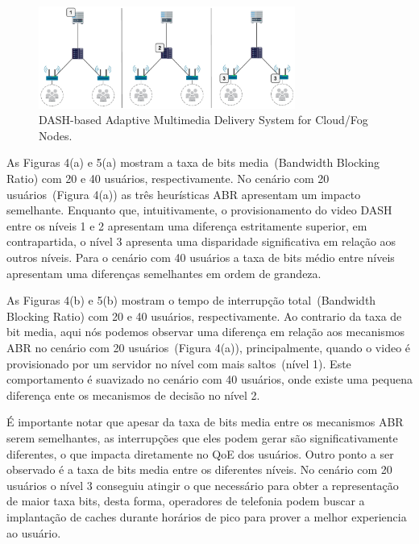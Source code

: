 
\begin{figure}[htpb]
	\centering
	\includegraphics[width=0.75\textwidth]{img/exp-multi-lvl}
	\caption{DASH-based Adaptive Multimedia Delivery System for Cloud/Fog Nodes.}
	\label{fig:scenario-arch}
\end{figure}

As Figuras 4(a) e 5(a) mostram a taxa de bits media~(Bandwidth Blocking Ratio) com 20 e 40 usuários, respectivamente. No cenário com 20 usuários~(Figura 4(a)) as três heurísticas ABR apresentam um impacto semelhante. Enquanto que, intuitivamente, o provisionamento do video DASH entre os níveis 1 e 2 apresentam uma diferença estritamente superior, em contrapartida, o nível 3 apresenta uma disparidade significativa em relação aos outros níveis. Para o cenário com 40 usuários a taxa de bits médio entre níveis apresentam uma diferenças semelhantes em ordem de grandeza. 

As Figuras 4(b) e 5(b) mostram o tempo de interrupção total~(Bandwidth Blocking Ratio) com 20 e 40 usuários, respectivamente. Ao contrario da taxa de bit media, aqui nós podemos observar uma diferença em relação aos mecanismos ABR no cenário com 20 usuários~(Figura 4(a)), principalmente, quando o video é provisionado por um servidor no nível com mais saltos~(nível 1). Este comportamento é suavizado no cenário com 40 usuários, onde existe uma pequena diferença ente os mecanismos de decisão no nível 2.

É importante notar que apesar da taxa de bits media entre os mecanismos ABR serem semelhantes, as interrupções que eles podem gerar são significativamente diferentes, o que impacta diretamente no QoE dos usuários. Outro ponto a ser observado é a taxa de bits media entre os diferentes níveis. No cenário com 20 usuários o nível 3 conseguiu atingir o que necessário para obter a representação de maior taxa bits, desta forma, operadores de telefonia podem buscar a implantação de caches durante horários de pico para prover a melhor experiencia ao usuário.

